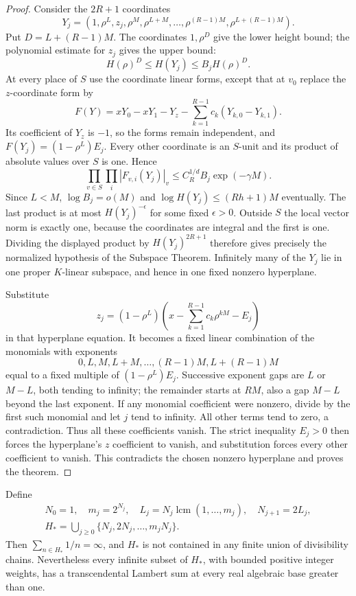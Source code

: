 \documentclass[11pt]{article}
\begin{document}
\begin{proof}
Consider the $2R+1$ coordinates
\[
 Y_j=(1,\rho^L,z_j,\rho^M,\rho^{L+M},\ldots,
          \rho^{(R-1)M},\rho^{L+(R-1)M}).
\]
Put $D=L+(R-1)M$. The coordinates $1,\rho^D$ give the lower height bound;
the polynomial estimate for $z_j$ gives the upper bound:
\begin{equation}\label{eq:cuts-height}
 H(\rho)^D\le H(Y_j)\le B_j H(\rho)^D.
\end{equation}
At every place of $S$ use the coordinate linear forms, except that at $v_0$
replace the $z$-coordinate form by
\[
 F(Y)=xY_0-xY_1-Y_z-\sum_{k=1}^{R-1}c_k(Y_{k,0}-Y_{k,1}).
\]
Its coefficient of $Y_z$ is $-1$, so the forms remain independent, and
$F(Y_j)=(1-\rho^L)E_j$. Every other coordinate is an $S$-unit and its
product of absolute values over $S$ is one. Hence
\[
 \prod_{v\in S}\prod_i|F_{v,i}(Y_j)|_v
 \le C_R^{1/d} B_j\exp(-\gamma M).
\]
Since $L<M$, $\log B_j=o(M)$ and
$\log H(Y_j)\le(Rh+1)M$ eventually. The last product is at most
$H(Y_j)^{-\epsilon}$ for some fixed $\epsilon>0$.
Outside $S$ the local vector norm is exactly one, because the coordinates
are integral and the first is one. Dividing the displayed product by
$H(Y_j)^{2R+1}$ therefore gives precisely the normalized hypothesis of
the Subspace Theorem. Infinitely many of the $Y_j$ lie in one proper
$K$-linear subspace, and hence in one fixed nonzero hyperplane.

Substitute
\[
 z_j=(1-\rho^L)\left(x-\sum_{k=1}^{R-1}c_k\rho^{kM}-E_j\right)
\]
in that hyperplane equation. It becomes a fixed linear combination of
the monomials with exponents
\[
 0,L,M,L+M,\ldots,(R-1)M,L+(R-1)M
\]
equal to a fixed multiple of $(1-\rho^L)E_j$. Successive exponent gaps
are $L$ or $M-L$, both tending to infinity; the remainder starts at $RM$,
also a gap $M-L$ beyond the last exponent. If any monomial coefficient
were nonzero, divide by the first such monomial and let $j$ tend to
infinity. All other terms tend to zero, a contradiction. Thus all these
coefficients vanish. The strict inequality $E_j>0$ then forces the
hyperplane's $z$ coefficient to vanish, and substitution forces every
other coefficient to vanish. This contradicts the chosen nonzero
hyperplane and proves the theorem.
\end{proof}

\begin{corollary}
\label{cor:cuts-wide-host}
Define
\[
 \begin{gathered}
 N_0=1,\quad m_j=2^{N_j},\quad
 L_j=N_j\operatorname{lcm}(1,\ldots,m_j),\quad N_{j+1}=2L_j,\\
 H_* = \bigcup_{j\ge0}\{N_j,2N_j,\ldots,m_jN_j\}.
 \end{gathered}
\]
Then $\sum_{n\in H_*}1/n=\infty$, and $H_*$ is not contained in any
finite union of divisibility chains. Nevertheless every infinite subset
of $H_*$, with bounded positive integer weights, has a transcendental
Lambert sum at every real algebraic base greater than one.
\end{corollary}
\end{document}

